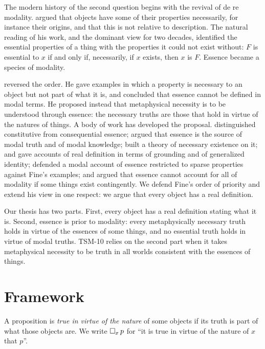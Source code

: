 \documentclass{situationist-preprint}
\begin{document}
The modern history of the second question begins with the revival of de re modality. \citet{Kripke1980} argued that objects have some of their properties necessarily, for instance their origins, and that this is not relative to description. The natural reading of his work, and the dominant view for two decades, identified the essential properties of a thing with the properties it could not exist without: $F$ is essential to $x$ if and only if, necessarily, if $x$ exists, then $x$ is $F$. Essence became a species of modality.

\citet{Fine1994} reversed the order. He gave examples in which a property is necessary to an object but not part of what it is, and concluded that essence cannot be defined in modal terms. He proposed instead that metaphysical necessity is to be understood through essence: the necessary truths are those that hold in virtue of the natures of things. A body of work has developed the proposal. \citet{Fine1995Senses} distinguished constitutive from consequential essence; \citet{Lowe2008,Lowe2012} argued that essence is the source of modal truth and of modal knowledge; \citet{Hale2013} built a theory of necessary existence on it; \citet{Rosen2015} and \citet{Dorr2016} gave accounts of real definition in terms of grounding and of generalized identity; \citet{Wildman2013} defended a modal account of essence restricted to sparse properties against Fine's examples; and \citet{Teitel2019} argued that essence cannot account for all of modality if some things exist contingently. We defend Fine's order of priority and extend his view in one respect: we argue that every object has a real definition.

Our thesis has two parts. First, every object has a real definition stating what it is. Second, essence is prior to modality: every metaphysically necessary truth holds in virtue of the essences of some things, and no essential truth holds in virtue of modal truths. TSM-10 relies on the second part when it takes metaphysical necessity to be truth in all worlds consistent with the essences of things.

\section{Framework}\label{s:framework}

\begin{definition}\label{d:essential}
A proposition is \emph{true in virtue of the nature} of some objects if its truth is part of what those objects are. We write $\mathord{\Box}_x\,p$ for \enquote{it is true in virtue of the nature of $x$ that $p$}.
\end{definition}
\end{document}
